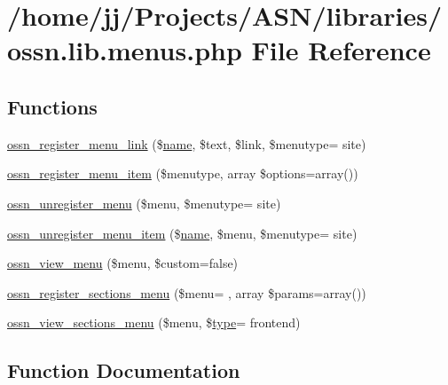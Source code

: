 \hypertarget{ossn_8lib_8menus_8php}{}\section{/home/jj/\+Projects/\+A\+S\+N/libraries/ossn.lib.\+menus.\+php File Reference}
\label{ossn_8lib_8menus_8php}
\subsection*{Functions}
\begin{DoxyCompactItemize}
\item 
\hyperlink{ossn_8lib_8menus_8php_a5910be474027aef6bf611a36b1f456a9}{ossn\+\_\+register\+\_\+menu\+\_\+link} (\$\hyperlink{user_8php_a765af5e9671743530143a6d3670fd9a6}{name}, \$text, \$link, \$menutype= \textquotesingle{}site\textquotesingle{})
\item 
\hyperlink{ossn_8lib_8menus_8php_a48ae31572338fca3793047458ce6dac9}{ossn\+\_\+register\+\_\+menu\+\_\+item} (\$menutype, array \$options=array())
\item 
\hyperlink{ossn_8lib_8menus_8php_a29865db21770e01bce1a4fda9cca0215}{ossn\+\_\+unregister\+\_\+menu} (\$menu, \$menutype= \textquotesingle{}site\textquotesingle{})
\item 
\hyperlink{ossn_8lib_8menus_8php_a86e5e8929b2d8a97472ee4e660a88cf3}{ossn\+\_\+unregister\+\_\+menu\+\_\+item} (\$\hyperlink{user_8php_a765af5e9671743530143a6d3670fd9a6}{name}, \$menu, \$menutype= \textquotesingle{}site\textquotesingle{})
\item 
\hyperlink{ossn_8lib_8menus_8php_ad2b0ea062432a8b878c3945c8c294e3d}{ossn\+\_\+view\+\_\+menu} (\$menu, \$custom=false)
\item 
\hyperlink{ossn_8lib_8menus_8php_ad31e4ee8d9436b57537511dc8cc8f7d3}{ossn\+\_\+register\+\_\+sections\+\_\+menu} (\$menu= \textquotesingle{}\textquotesingle{}, array \$params=array())
\item 
\hyperlink{ossn_8lib_8menus_8php_a4f69dd8d47e7b9df9f4181bc031f6407}{ossn\+\_\+view\+\_\+sections\+\_\+menu} (\$menu, \$\hyperlink{_ossn_wall_2actions_2wall_2post_2group_8php_a2dc1bb4e1ed0029daa81ac0776b14b51}{type}= \textquotesingle{}frontend\textquotesingle{})
\end{DoxyCompactItemize}


\subsection{Function Documentation}
